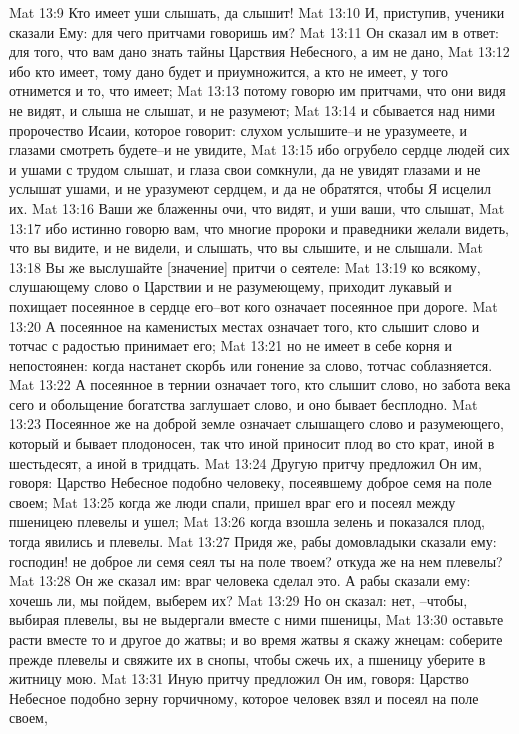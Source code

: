 Mat 13:9  Кто имеет уши слышать, да слышит!
Mat 13:10  И, приступив, ученики сказали Ему: для чего притчами говоришь им?
Mat 13:11  Он сказал им в ответ: для того, что вам дано знать тайны Царствия Небесного, а им не дано,
Mat 13:12  ибо кто имеет, тому дано будет и приумножится, а кто не имеет, у того отнимется и то, что имеет;
Mat 13:13  потому говорю им притчами, что они видя не видят, и слыша не слышат, и не разумеют;
Mat 13:14  и сбывается над ними пророчество Исаии, которое говорит: слухом услышите--и не уразумеете, и глазами смотреть будете--и не увидите,
Mat 13:15  ибо огрубело сердце людей сих и ушами с трудом слышат, и глаза свои сомкнули, да не увидят глазами и не услышат ушами, и не уразумеют сердцем, и да не обратятся, чтобы Я исцелил их.
Mat 13:16  Ваши же блаженны очи, что видят, и уши ваши, что слышат,
Mat 13:17  ибо истинно говорю вам, что многие пророки и праведники желали видеть, что вы видите, и не видели, и слышать, что вы слышите, и не слышали.
Mat 13:18  Вы же выслушайте [значение] притчи о сеятеле:
Mat 13:19  ко всякому, слушающему слово о Царствии и не разумеющему, приходит лукавый и похищает посеянное в сердце его--вот кого означает посеянное при дороге.
Mat 13:20  А посеянное на каменистых местах означает того, кто слышит слово и тотчас с радостью принимает его;
Mat 13:21  но не имеет в себе корня и непостоянен: когда настанет скорбь или гонение за слово, тотчас соблазняется.
Mat 13:22  А посеянное в тернии означает того, кто слышит слово, но забота века сего и обольщение богатства заглушает слово, и оно бывает бесплодно.
Mat 13:23  Посеянное же на доброй земле означает слышащего слово и разумеющего, который и бывает плодоносен, так что иной приносит плод во сто крат, иной в шестьдесят, а иной в тридцать.
Mat 13:24  Другую притчу предложил Он им, говоря: Царство Небесное подобно человеку, посеявшему доброе семя на поле своем;
Mat 13:25  когда же люди спали, пришел враг его и посеял между пшеницею плевелы и ушел;
Mat 13:26  когда взошла зелень и показался плод, тогда явились и плевелы.
Mat 13:27  Придя же, рабы домовладыки сказали ему: господин! не доброе ли семя сеял ты на поле твоем? откуда же на нем плевелы?
Mat 13:28  Он же сказал им: враг человека сделал это. А рабы сказали ему: хочешь ли, мы пойдем, выберем их?
Mat 13:29  Но он сказал: нет, --чтобы, выбирая плевелы, вы не выдергали вместе с ними пшеницы,
Mat 13:30  оставьте расти вместе то и другое до жатвы; и во время жатвы я скажу жнецам: соберите прежде плевелы и свяжите их в снопы, чтобы сжечь их, а пшеницу уберите в житницу мою.
Mat 13:31  Иную притчу предложил Он им, говоря: Царство Небесное подобно зерну горчичному, которое человек взял и посеял на поле своем,
